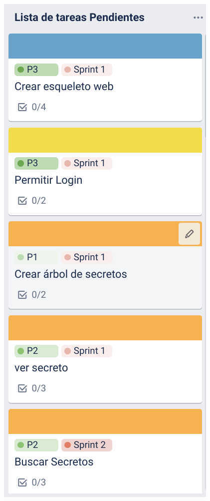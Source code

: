\documentclass{\ClassPath/viu-tfm-template}
\begin{document}
\begin{minipage}{0.32\linewidth}
    \includegraphics[width=\linewidth]{img/tareas.png}
    \label{figure:tareas_pendientes}
\end{minipage}
\end{document}
